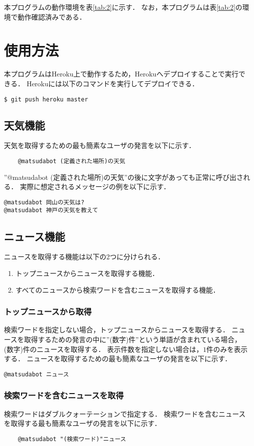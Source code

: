 \documentclass[12pt]{jsarticle}
\begin{document}
本プログラムの動作環境を表\ref{tab:2}に示す．
なお，本プログラムは表\ref{tab:2}の環境で動作確認済みである．
\section{使用方法}
本プログラムはHeroku上で動作するため，Herokuへデプロイすることで実行できる．
Herokuには以下のコマンドを実行してデプロイできる．
\begin{verbatim}
$ git push heroku master
\end{verbatim}

\subsection{天気機能}
天気を取得するための最も簡素なユーザの発言を以下に示す．
\begin{verbatim}
	@matsudabot (定義された場所)の天気
\end{verbatim}
''@matsudabot (定義された場所)の天気''の後に文字があっても正常に呼び出される．
実際に想定されるメッセージの例を以下に示す．
\begin{verbatim}
@matsudabot 岡山の天気は?
@matsudabot 神戸の天気を教えて
\end{verbatim}

\subsection{ニュース機能}
ニュースを取得する機能は以下の2つに分けられる．
\begin{enumerate}
\item トップニュースからニュースを取得する機能．
\item すべてのニュースから検索ワードを含むニュースを取得する機能．
\end{enumerate}
\subsubsection{トップニュースから取得}
検索ワードを指定しない場合，トップニュースからニュースを取得する．
ニュースを取得するための発言の中に''(数字)件''という単語が含まれている場合，(数字)件のニュースを取得する．
表示件数を指定しない場合は，$1$件のみを表示する．
ニュースを取得するための最も簡素なユーザの発言を以下に示す．
\begin{verbatim}
@matsudabot ニュース
\end{verbatim}
\subsubsection{検索ワードを含むニュースを取得}
検索ワードはダブルクォーテーションで指定する．
検索ワードを含むニュースを取得する最も簡素なユーザの発言を以下に示す．
\begin{verbatim}
	@matsudabot "(検索ワード)"ニュース
\end{verbatim}
\end{document}
